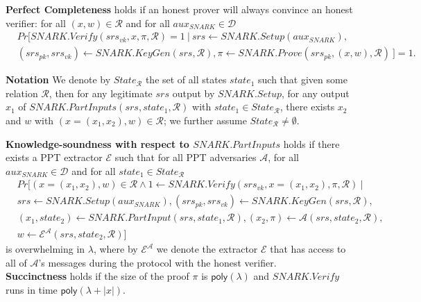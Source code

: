 \begin{definition}
\noindent \textbf{Perfect Completeness} holds if an honest prover will always convince an honest verifier: for all  
$(x,w) \in \mathcal{R}$ and for all $\mathit{aux_{\mathit{SNARK}}} \in \mathcal{D}$
\begin{align*}
& \mathit{Pr}[\mathit{SNARK.Verify}(\mathit{srs_{vk}}, x, \pi, \mathcal{R}) = 1 \ | \  
\mathit{srs} \leftarrow \mathit{SNARK.Setup}(\mathit{aux_{\mathit{SNARK}}}), \\ 
& (\mathit{srs_{pk}}, \mathit{srs_{vk}})\leftarrow \mathit{SNARK.KeyGen}(\mathit{srs}, \mathcal{R}), \pi \leftarrow \mathit{SNARK.Prove}(\mathit{srs_{pk}}, (x,w), \mathcal{R}) \ ] = 1.
\end{align*}

\noindent \textbf{Notation} We denote by $\mathit{State_{\mathcal{R}}}$ the set of all states $\mathit{state}_1$ 
such that given some relation $\mathcal{R}$, then for any legitimate $\mathit{srs}$ output by $\mathit{SNARK.Setup}$, 
for any output $x_1$ of $\mathit{SNARK.PartInputs}(\mathit{srs}, \mathit{state}_1, \mathcal{R})$ 
with $\mathit{state_1} \in \mathit{State_{\mathcal{R}}}$, there exists $x_2$ and $w$ with $(x=(x_1, x_2), w) \in \mathcal{R}$; 
we further assume $\mathit{State_{\mathcal{R}}} \neq \emptyset$.\\
\vspace{-0.08in}

\noindent \textbf{Knowledge-soundness with respect to $\mathit{SNARK.PartInputs}$}
holds if there exists a PPT extractor $\mathcal{E}$ such that for all PPT 
adversaries $\mathcal{A}$, for all $\mathit{aux_{\mathit{SNARK}}} \in \mathcal{D}$ and for all $\mathit{state_1} \in \mathit{State_{\mathcal{R}}}$
\begin{align*}
&\mathit{Pr}[(x = (x_1, x_2), w) \in \mathcal{R} \wedge 1 \leftarrow \mathit{SNARK.Verify}(\mathit{srs_{vk}}, x =  (x_1, x_2), \pi, \mathcal{R}) \ | \\
&\mathit{srs} \leftarrow \mathit{SNARK.Setup}(\mathit{aux_{\mathit{SNARK}}}), (\mathit{srs_{pk}}, \mathit{srs_{vk}})\leftarrow  \mathit{SNARK.KeyGen}(\mathit{srs}, \mathcal{R}), \\ 
& (x_1, \mathit{state}_2) \leftarrow \mathit{SNARK.PartInput}(\mathit{srs}, \mathit{state}_1, \mathcal{R}), (x_2, \pi) \leftarrow \mathcal{A}(\mathit{srs}, \mathit{state}_2, \mathcal{R}), \\
& w \leftarrow \mathcal{E}^{\mathcal{A}}(srs, \mathit{state}_2, \mathcal{R})]
\end{align*}
\noindent is overwhelming in $\lambda$, where by $\mathcal{E}^{\mathcal{A}}$ we denote the extractor $\mathcal{E}$ that has access to all of 
$\mathcal{A}$'s messages during the protocol with the honest verifier. \\ 
\noindent \textbf{Succinctness} holds if the size of the proof $\pi$ is $\mathsf{poly}(\lambda)$ and $\mathit{SNARK.Verify}$ runs in time 
$\mathsf{poly}(\lambda + |x|)$. %
\end{definition}
